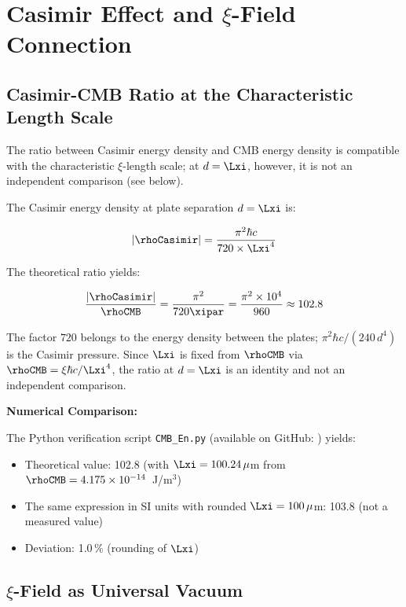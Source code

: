 	\section{Casimir Effect and $\xi$-Field Connection}
	
	\subsection{Casimir-CMB Ratio at the Characteristic Length Scale}
	
	The ratio between Casimir energy density and CMB energy density is compatible with the characteristic $\xi$-length scale; at $d = \Lxi$, however, it is not an independent comparison (see below).
	
	The Casimir energy density at plate separation $d = \Lxi$ is:
	
	\begin{equation}
		|\rhoCasimir| = \frac{\pi^2 \hbar c}{720 \times \Lxi^4}
	\end{equation}
	
	The theoretical ratio yields:
	
	\begin{equation}
		\frac{|\rhoCasimir|}{\rhoCMB} = \frac{\pi^2}{720 \xipar} = \frac{\pi^2 \times 10^4}{960} \approx 102.8
	\end{equation}
	
	The factor $720$ belongs to the energy density between the plates; $\pi^2\hbar c/(240\,d^4)$ is the Casimir pressure. Since $\Lxi$ is fixed from $\rhoCMB$ via $\rhoCMB = \xi\hbar c/\Lxi^4$, the ratio at $d = \Lxi$ is an identity and not an independent comparison.
	
	\begin{experiment}
		\textbf{Numerical Comparison:}
		
		The Python verification script \texttt{CMB\_En.py} (available on GitHub: ) yields:
		
		\begin{itemize}
			\item Theoretical value: 102.8 (with $\Lxi = 100.24\,\mu$m from $\rhoCMB = 4.175 \times 10^{-14}$~J/m$^3$)
			\item The same expression in SI units with rounded $\Lxi = 100\,\mu$m: 103.8 (not a measured value)
			\item Deviation: 1.0\,\% (rounding of $\Lxi$)
		\end{itemize}
	\end{experiment}
	
	\subsection{$\xi$-Field as Universal Vacuum}
	
